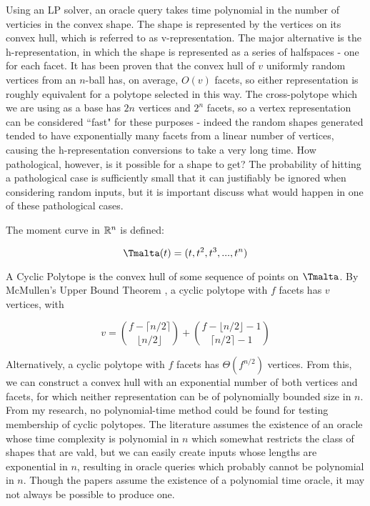 Using an LP solver, an oracle query takes time polynomial in the number of verticies in the convex shape. The shape is represented by the vertices on its convex hull, which is referred to as v-representation. The major alternative is the h-representation, in which the shape is represented as a series of halfspaces - one for each facet. It has been proven \cite{Buchta85} that the convex hull of $v$ uniformly random vertices from an $n$-ball has, on average, $O(v)$ facets, so either representation is roughly equivalent for a polytope selected in this way. The cross-polytope which we are using as a base has $2n$ vertices and $2^n$ facets, so a vertex representation can be considered ``fast" for these purposes - indeed the random shapes generated tended to have exponentially many facets from a linear number of vertices, causing the h-representation conversions to take a very long time. How pathological, however, is it possible for a shape to get? The probability of hitting a pathological case is sufficiently small that it can justifiably be ignored when considering random inputs, but it is important discuss what would happen in one of these pathological cases.

The moment curve in $\mathbb{R}^n$ is defined:

$$
\tengm(t) = (t, t^2, t^3, ..., t^n)
$$

A Cyclic Polytope is the convex hull of some sequence of points on $\tengm$. By McMullen's Upper Bound Theorem \cite{McMullen70}, a cyclic polytope with $f$ facets has $v$ vertices, with

$$
v = {{f-\lceil n/2 \rceil}\choose{\lfloor {n/2} \rfloor}} + {{f-\lfloor n/2 \rfloor -1} \choose {\lceil {n/2} \rceil - 1}}
$$

Alternatively, a cyclic polytope with $f$ facets has $\Theta(f^{n/2})$ vertices. From this, we can construct a convex hull with an exponential number of both vertices and facets, for which neither representation can be of polynomially bounded size in $n$. From my research, no polynomial-time method could be found for testing membership of cyclic polytopes. The literature assumes the existence of an oracle whose time complexity is polynomial in $n$ which somewhat restricts the class of shapes that are vald, but we can easily create inputs whose lengths are exponential in $n$, resulting in oracle queries which probably cannot be polynomial in $n$. Though the papers assume the existence of a polynomial time oracle, it may not always be possible to produce one.